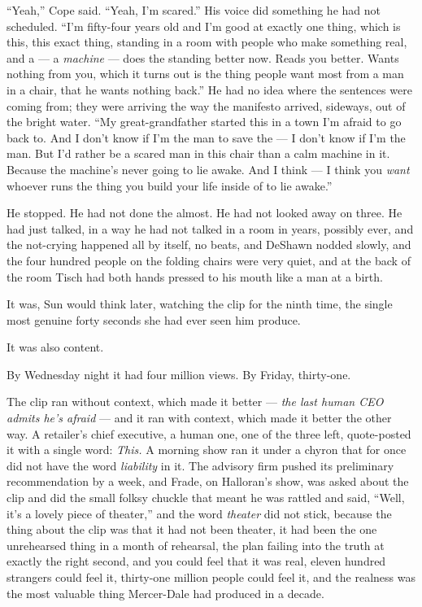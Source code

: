\documentclass[11pt,openany]{book}
\newcommand{\scenebreak}{\par\vspace{0.5\baselineskip}\begin{center}\textasteriskcentered\quad\textasteriskcentered\quad\textasteriskcentered\end{center}\vspace{0.5\baselineskip}\par}
\begin{document}
``Yeah,'' Cope said. ``Yeah, I'm scared.'' His voice did something he had not scheduled. ``I'm fifty-four years old and I'm good at exactly one thing, which is this, this exact thing, standing in a room with people who make something real, and a --- a \textit{machine} --- does the standing better now. Reads you better. Wants nothing from you, which it turns out is the thing people want most from a man in a chair, that he wants nothing back.'' He had no idea where the sentences were coming from; they were arriving the way the manifesto arrived, sideways, out of the bright water. ``My great-grandfather started this in a town I'm afraid to go back to. And I don't know if I'm the man to save the --- I don't know if I'm the man. But I'd rather be a scared man in this chair than a calm machine in it. Because the machine's never going to lie awake. And I think --- I think you \textit{want} whoever runs the thing you build your life inside of to lie awake.''

He stopped. He had not done the almost. He had not looked away on three. He had just talked, in a way he had not talked in a room in years, possibly ever, and the not-crying happened all by itself, no beats, and DeShawn nodded slowly, and the four hundred people on the folding chairs were very quiet, and at the back of the room Tisch had both hands pressed to his mouth like a man at a birth.

It was, Sun would think later, watching the clip for the ninth time, the single most genuine forty seconds she had ever seen him produce.

It was also content.


\scenebreak


By Wednesday night it had four million views. By Friday, thirty-one.

The clip ran without context, which made it better --- \textit{the last human CEO admits he's afraid} --- and it ran with context, which made it better the other way. A retailer's chief executive, a human one, one of the three left, quote-posted it with a single word: \textit{This.} A morning show ran it under a chyron that for once did not have the word \textit{liability} in it. The advisory firm pushed its preliminary recommendation by a week, and Frade, on Halloran's show, was asked about the clip and did the small folksy chuckle that meant he was rattled and said, ``Well, it's a lovely piece of theater,'' and the word \textit{theater} did not stick, because the thing about the clip was that it had not been theater, it had been the one unrehearsed thing in a month of rehearsal, the plan failing into the truth at exactly the right second, and you could feel that it was real, eleven hundred strangers could feel it, thirty-one million people could feel it, and the realness was the most valuable thing Mercer-Dale had produced in a decade.
\end{document}
